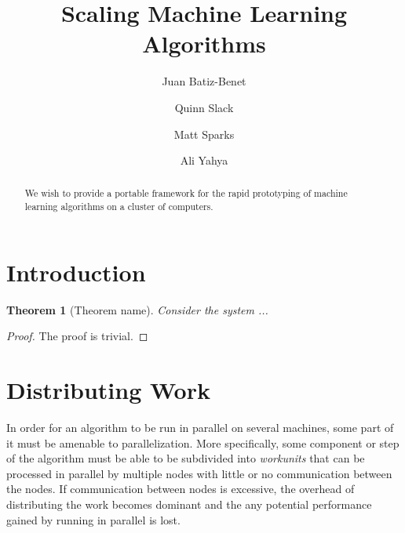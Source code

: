 \documentclass[%
        final,
        notitlepage,
        narroweqnarray,
        inline,
        ]{ieee}
\begin{document}
\title{Scaling Machine Learning Algorithms}

\author[SHORT NAMES]{
  Juan Batiz-Benet \\
  \and{\quad\quad}
  Quinn Slack \\
  \and{\quad\quad}
  Matt Sparks \\
  \and{\quad\quad}
  Ali Yahya
}




\maketitle

\begin{abstract}
We wish to provide a portable framework for the rapid prototyping of machine
learning algorithms on a cluster of computers.
\end{abstract}


\section{Introduction}

\newtheorem{theorem}{Theorem}

\begin{theorem}[Theorem name]
  Consider the system ...
\end{theorem}

\begin{proof}
  The proof is trivial.
\end{proof}

\section{Distributing Work}

In order for an algorithm to be run in parallel on several machines, some part
of it must be amenable to parallelization. More specifically, some component or
step of the algorithm must be able to be subdivided into \emph{workunits} that
can be processed in parallel by multiple nodes with little or no communication
between the nodes. If communication between nodes is excessive, the overhead of
distributing the work becomes dominant and the any potential performance gained
by running in parallel is lost.
\end{document}
